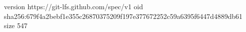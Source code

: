 version https://git-lfs.github.com/spec/v1
oid sha256:679f4a2bebf1e355c26870375209f197e377672252c59a6395f6447d4889db61
size 547
